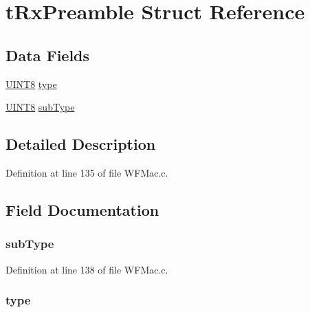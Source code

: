 \hypertarget{structt_rx_preamble}{}\section{t\+Rx\+Preamble Struct Reference}
\label{structt_rx_preamble}
\subsection*{Data Fields}
\begin{DoxyCompactItemize}
\item 
\hyperlink{_generic_type_defs_8h_ab27e9918b538ce9d8ca692479b375b6a}{U\+I\+N\+T8} \hyperlink{structt_rx_preamble_a631bceb766461ab7475c7ed56717aac8}{type}
\item 
\hyperlink{_generic_type_defs_8h_ab27e9918b538ce9d8ca692479b375b6a}{U\+I\+N\+T8} \hyperlink{structt_rx_preamble_a6b8a16b4fff234af40d01cd46be5be45}{sub\+Type}
\end{DoxyCompactItemize}


\subsection{Detailed Description}


Definition at line 135 of file W\+F\+Mac.\+c.



\subsection{Field Documentation}
\hypertarget{structt_rx_preamble_a6b8a16b4fff234af40d01cd46be5be45}{}
\subsubsection[{sub\+Type}]{ sub\+Type}\label{structt_rx_preamble_a6b8a16b4fff234af40d01cd46be5be45}


Definition at line 138 of file W\+F\+Mac.\+c.

\hypertarget{structt_rx_preamble_a631bceb766461ab7475c7ed56717aac8}{}
\subsubsection[{type}]{ type}\label{structt_rx_preamble_a631bceb766461ab7475c7ed56717aac8}


